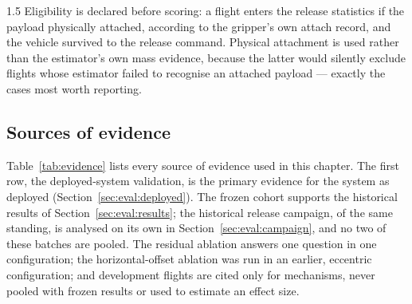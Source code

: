 \begin{spacing}{1.5}
Eligibility is declared before scoring: a flight enters the release statistics if
the payload physically attached, according to the gripper's own attach record,
and the vehicle survived to the release command. Physical attachment is used
rather than the estimator's own mass evidence, because the latter would silently
exclude flights whose estimator failed to recognise an attached payload ---
exactly the cases most worth reporting.

\subsection{Sources of evidence}\label{sec:eval:evidence}

Table~\ref{tab:evidence} lists every source of evidence used in this chapter.
The first row, the deployed-system validation, is the primary evidence for the
system as deployed (Section~\ref{sec:eval:deployed}). The frozen cohort supports
the historical results of Section~\ref{sec:eval:results}; the historical
release campaign, of the same standing, is analysed on its own in
Section~\ref{sec:eval:campaign}, and no two of these batches are pooled. The residual ablation
answers one question in one configuration; the horizontal-offset ablation
was run in an earlier, eccentric configuration; and development flights are
cited only for mechanisms, never pooled with frozen results or used to estimate
an effect size.


\end{spacing}
